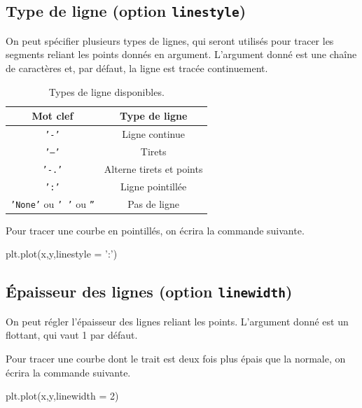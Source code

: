 \subsection{Type de ligne (option \texttt{linestyle})}

On peut spécifier plusieurs types de lignes, qui seront utilisés pour tracer les segments reliant les points donnés en argument. 
L'argument donné est une chaîne de caractères et, par défaut, la ligne est tracée continuement. 

\begin{table}[!h]
  \begin{center}
    \begin{tabular}{|c|c|}
      \hline
      Mot clef & Type de ligne \\
      \hline
      \texttt{'-'} & Ligne continue \\
      \hline
      \texttt{'--'} & Tirets  \\
      \hline
      \texttt{'-.'} & Alterne tirets et points \\
      \hline
      \texttt{':'} & Ligne pointillée \\
      \hline
      \texttt{'None'} ou \texttt{' '} ou \texttt{''} & Pas de ligne \\
      \hline
    \end{tabular}
    \caption{Types de ligne disponibles.}
  \end{center}
\end{table}

\begin{ex}
  Pour tracer une courbe en pointillés, on écrira la commande suivante.
\begin{pyverbatim}
plt.plot(x,y,linestyle = ':')
\end{pyverbatim}
\end{ex}

\subsection{Épaisseur des lignes (option \texttt{linewidth})}

On peut régler l'épaisseur des lignes reliant les points.
L'argument donné est un flottant, qui vaut 1 par défaut. 

\begin{ex}
  Pour tracer une courbe dont le trait est deux fois plus épais que la normale, on écrira la commande suivante.
\begin{pyverbatim}
plt.plot(x,y,linewidth = 2)
\end{pyverbatim}
\end{ex}

